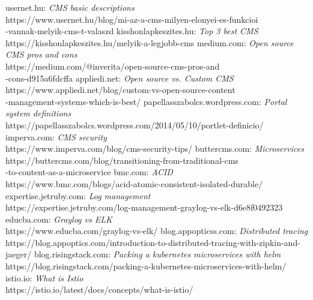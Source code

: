 \begin{thebibliography}{x}
 usernet.hu: {\em CMS basic descriptions}\\
{\ttfamily https://www.usernet.hu/blog/mi-az-a-cms-milyen-elonyei-es-funkcioi\\-vannak-melyik-cms-t-valaszd}
 kisshonlapkeszites.hu: {\em Top 3 best CMS}\\
{\ttfamily https://kisshonlapkeszites.hu/melyik-a-legjobb-cms}
 medium.com: {\em Open source CMS pros and cons}\\
{\ttfamily https://medium.com/@inverita/open-source-cms-pros-and\\-cons-d915a6fdcffa}
 appliedi.net: {\em Open source vs. Custom CMS}\\
{\ttfamily https://www.appliedi.net/blog/custom-vs-open-source-content\\-management-systems-which-is-best/}
 papellasszabolcs.wordpress.com: {\em Portal system definitions}\\
{\ttfamily https://papellasszabolcs.wordpress.com/2014/05/10/portlet-definicio/}
 imperva.com: {\em CMS security}\\
{\ttfamily https://www.imperva.com/blog/cms-security-tips/}
 buttercms.com: {\em Microservices}\\
{\ttfamily https://buttercms.com/blog/transitioning-from-traditional-cms\\-to-content-as-a-microservice}
 bmc.com: {\em ACID}\\
{\ttfamily https://www.bmc.com/blogs/acid-atomic-consistent-isolated-durable/}
 expertise.jetruby.com: {\em Log management}\\
{\ttfamily https://expertise.jetruby.com/log-management-graylog-vs-elk-d6e8f0492323}
 educba.com: {\em Graylog vs ELK}\\
{\ttfamily https://www.educba.com/graylog-vs-elk/}
 blog.appopticss.com: {\em Distributed tracing}\\
{\ttfamily https://blog.appoptics.com/introduction-to-distributed-tracing-with-zipkin-and-jaeger/}
 blog.risingstack.com: {\em Packing a kubernetes microservices with helm}\\
{\ttfamily https://blog.risingstack.com/packing-a-kubernetes-microservices-with-helm/}
 istio.io: {\em What is Istio}\\
{\ttfamily https://istio.io/latest/docs/concepts/what-is-istio/}
\end{thebibliography}

